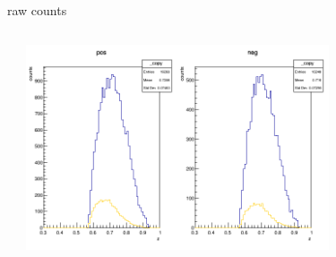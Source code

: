 \begin{frame}{raw counts}
\begin{columns}
\begin{column}[T]{0.5\textwidth}
\end{column}
\begin{column}[T]{0.5\textwidth}
\includegraphics[width = 0.7\textwidth]{results/yield/statistics/counts_x_Q2_z_0.45_3.898_0.70.png}
\end{column}
\end{columns}
\end{frame}
